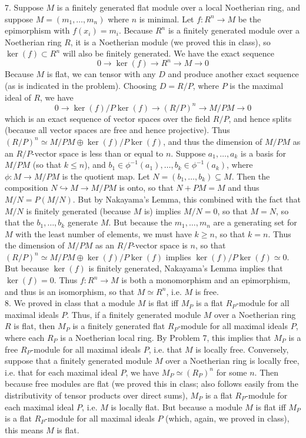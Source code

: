 \documentclass[11pt]{article}
\begin{document}
\num{7.} \rmfamily \normalsize Suppose $M$ is a finitely generated flat module
over a local Noetherian ring, and suppose $M=(m_1,\ldots,m_n)$ where $n$ is
minimal. Let $f:R^n\rightarrow M$ be the epimorphism with $f(x_i)=m_i$. Because
$R^n$ is a finitely generated module over a Noetherian ring $R$, it is a
Noetherian module (we proved this in class), so $\ker(f)\subset R^n$ will
also be finitely generated. We have the exact sequence
\[0\rightarrow \ker(f)\rightarrow R^n\rightarrow M\rightarrow 0\]
Because $M$ is flat, we can tensor with any $D$ and produce another exact
sequence (as is indicated in the problem). Choosing $D=R/P$, where $P$
is the maximal ideal of $R$, we have
\[0\rightarrow \ker(f)/P\ker(f)\rightarrow (R/P)^n\rightarrow
M/PM\rightarrow0\]
which is an exact sequence of vector spaces over the field $R/P$,
and hence splits (because all vector spaces are free and hence
projective). Thus $(R/P)^n\simeq M/PM\oplus \ker(f)/P\ker(f)$, and thus
the dimension of $M/PM$ as an $R/P$-vector space is less than or equal to
$n$. Suppose $a_1,\ldots,a_k$ is a basis for $M/PM$ (so that $k\leq n$), and
$b_1\in\phi^{-1}(a_1),\ldots,b_k\in\phi^{-1}(a_k)$, where $\phi:M\rightarrow
M/PM$ is the quotient map. Let $N=(b_1,\ldots,b_k)\subseteq M$. Then the
composition $N\hookrightarrow M\rightarrow M/PM$ is onto, so that $N+PM=M$ and
thus $M/N=P(M/N)$. But by Nakayama's Lemma, this combined with the fact that
$M/N$ is finitely generated (because $M$ is) implies $M/N=0$, so that $M=N$,
so that the $b_1,\ldots,b_k$ generate $M$. But because the $m_1,\ldots,m_n$
are a generating set for $M$ with the least number of elements, we must have
$k\geq n$, so that $k=n$. Thus the dimension of $M/PM$ as an $R/P$-vector
space is $n$, so that $(R/P)^n\simeq M/PM\oplus \ker(f)/P\ker(f)$ implies
$\ker(f)/P\ker(f)\simeq0$. But because $\ker(f)$ is finitely generated,
Nakayama's Lemma implies that $\ker(f)=0$. Thus $f:R^n\rightarrow M$ is
both a monomorphism and an epimorphism, and thus is an isomorphism, so that
$M\simeq R^n$, i.e. $M$ is free.  \\

\num{8.} We proved in class that a module $M$ is flat iff $M_P$ is a flat
$R_P$-module for all maximal ideals $P$. Thus, if a finitely generated module
$M$ over a Noetherian ring $R$ is flat, then $M_P$ is a finitely generated
flat $R_P$-module for all maximal ideals $P$, where each $R_P$ is a Noetherian
local ring. By Problem 7, this implies that $M_P$ is a free $R_P$-module for
all maximal ideals $P$, i.e. that $M$ is locally free. Conversely, suppose
that a finitely generated module $M$ over a Noetherian ring is locally free,
i.e. that for each maximal ideal $P$, we have $M_P\simeq (R_P)^n$ for some
$n$. Then because free modules are flat (we proved this in class; also follows
easily from the distributivity of tensor products over direct sums), $M_P$ is
a flat $R_P$-module for each maximal ideal $P$, i.e. $M$ is locally flat. But
because a module $M$ is flat iff $M_P$ is a flat $R_P$-module for all maximal
ideals $P$ (which, again, we proved in class), this means $M$ is flat.      \\
\end{document}
